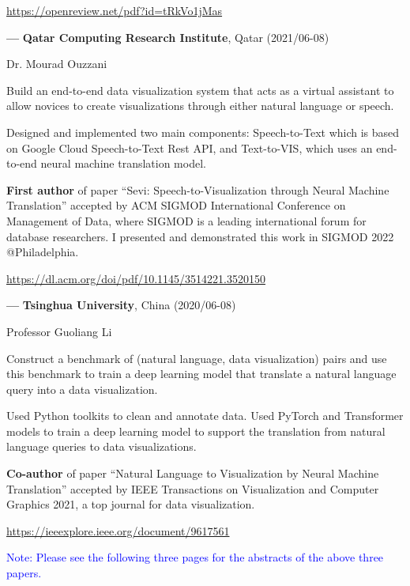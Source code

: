 \documentclass[10pt,a4paper,sans]{./moderncv/moderncv}
\begin{document}
{\url{https://openreview.net/pdf?id=tRkVo1jMas}}

\vspace{2ex}
\cvline
{\textbf{\Large ---}}
{\large\textbf{Qatar Computing Research Institute}, Qatar (2021/06-08)}

{Dr. Mourad Ouzzani}

{Build an end-to-end data visualization system that acts as a virtual assistant to allow novices to create visualizations through either natural language or speech.}

{Designed and implemented two main components: Speech-to-Text which is based on Google Cloud Speech-to-Text Rest API, and Text-to-VIS, which uses an end-to-end neural machine translation model.}

{\textbf{First author} of paper ``Sevi: Speech-to-Visualization through Neural Machine Translation'' accepted by ACM SIGMOD International Conference on Management of Data, where SIGMOD is a leading international forum for database researchers. I presented and demonstrated this work in SIGMOD 2022 @Philadelphia.}

{\url{https://dl.acm.org/doi/pdf/10.1145/3514221.3520150}}

\vspace{2ex}
\cvline
{\textbf{\Large ---}}
{\large\textbf{Tsinghua University}, China (2020/06-08)}


{Professor Guoliang Li}

{Construct a benchmark of (natural language, data visualization) pairs and use this benchmark to train a deep learning model that translate a natural language query into a data visualization.}

{Used Python toolkits to clean and annotate data. Used PyTorch and Transformer models to train a deep learning model to support the translation from natural language queries to data visualizations.}

{\textbf{Co-author} of paper ``Natural Language to Visualization by Neural Machine Translation'' accepted by IEEE Transactions on Visualization and Computer Graphics 2021, a top journal for data visualization.}

{\url{https://ieeexplore.ieee.org/document/9617561}}

\vspace{2ex}

\textcolor{blue}{Note: Please see the following three pages for the abstracts of the above three papers.}
\end{document}
